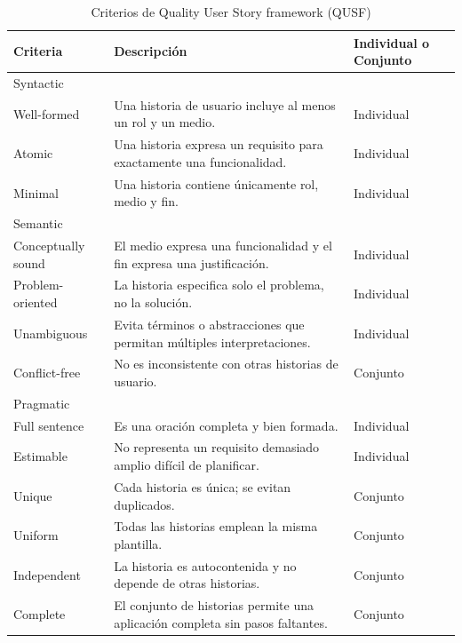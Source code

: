 \begin{longtable}{|l|p{6cm}|p{2cm}|}
\caption{Criterios de Quality User Story framework (QUSF)}
\label{table:qusf} \\
\hline
\textbf{Criteria} & \textbf{Descripción} & \textbf{Individual o Conjunto} \\
\hline

\multicolumn{3}{|l|}{Syntactic} \\ \hline
Well-formed & Una historia de usuario incluye al menos un rol y un medio. & Individual \\ \hline
Atomic & Una historia expresa un requisito para exactamente una funcionalidad. & Individual \\ \hline
Minimal & Una historia contiene únicamente rol, medio y fin. & Individual \\ \hline

\multicolumn{3}{|l|}{Semantic} \\ \hline
Conceptually sound & El medio expresa una funcionalidad y el fin expresa una justificación. & Individual \\ \hline
Problem-oriented & La historia especifica solo el problema, no la solución. & Individual \\ \hline
Unambiguous & Evita términos o abstracciones que permitan múltiples interpretaciones. & Individual \\ \hline
Conflict-free & No es inconsistente con otras historias de usuario. & Conjunto \\ \hline

\multicolumn{3}{|l|}{Pragmatic} \\ \hline
Full sentence & Es una oración completa y bien formada. & Individual \\ \hline
Estimable & No representa un requisito demasiado amplio difícil de planificar. & Individual \\ \hline
Unique & Cada historia es única; se evitan duplicados. & Conjunto \\ \hline
Uniform & Todas las historias emplean la misma plantilla. & Conjunto \\ \hline
Independent & La historia es autocontenida y no depende de otras historias. & Conjunto \\ \hline
Complete & El conjunto de historias permite una aplicación completa sin pasos faltantes. & Conjunto \\ \hline
\end{longtable}

